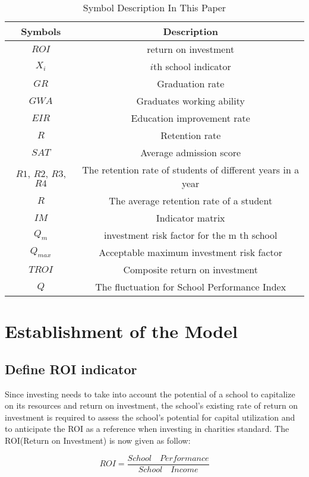 \documentclass{mcmthesis}
\begin{document}
\begin{table}[h]
\centering
\caption{Symbol Description In This Paper}
\label{tab:Symbol Description}
\begin{tabular}{cc}
\toprule
Symbols & Description\\
\midrule
$ROI$ & return on investment\\
$X_i$ & $i$th school indicator\\
$GR$ &  Graduation rate\\
$GWA$ &  Graduates working ability\\
$EIR$ &  Education improvement rate\\
$R$ &  Retention rate\\
$SAT$ &  Average admission score\\
$R1$, $R2$, $R3$, $R4$& The retention rate of students of different years in a year\\
$R$ & The average retention rate of a student\\
$IM$ & Indicator matrix\\
$Q_m$ & investment risk factor for the m th school\\
$Q_{max}$ & Acceptable maximum investment risk factor\\
$TROI$ & Composite return on investment\\
$Q$ & The fluctuation for School Performance Index\\

\bottomrule
\end{tabular}
\end{table}


\section{Establishment of the Model}

\subsection{Define ROI indicator}
Since investing needs to take into account the potential of a school to capitalize on its resources and return on investment, the school's existing rate of return on investment is required to assess the school's potential for capital utilization and to anticipate the ROI as a reference when investing in charities standard. The ROI(Return on Investment) is now given as follow:

\begin{equation}
	\label{ROI Def}
	ROI = \frac{School \quad Performance}{School \quad Income}
\end{equation}
\end{document}
